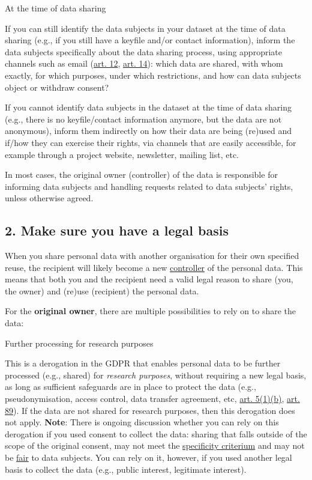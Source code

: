 \documentclass[
]{book}
\begin{document}
At the time of data sharing

If you can still identify the data subjects in your dataset at the time
of data sharing (e.g., if you still have a keyfile and/or contact information),
inform the data subjects specifically about the data sharing process, using
appropriate channels such as email
(\href{https://gdpr-info.eu/art-12-gdpr/}{art. 12},
\href{https://gdpr-info.eu/art-14-gdpr/}{art. 14}): which data are
shared, with whom exactly, for which purposes, under which restrictions, and
how can data subjects object or withdraw consent?

If you cannot identify data subjects in the dataset at the time of data sharing
(e.g., there is no keyfile/contact information anymore, but the data are not
anonymous), inform them indirectly on how their data are being (re)used and
if/how they can exercise their rights, via channels that are easily accessible,
for example through a project website, newsletter, mailing list, etc.

In most cases, the original owner (controller) of the data is responsible for
informing data subjects and handling requests related to data subjects' rights,
unless otherwise agreed.

\hypertarget{legal-basis-reuse}{%
\subsection{2. Make sure you have a legal basis}\label{legal-basis-reuse}}

When you share personal data with another organisation for their own specified
reuse, the recipient will likely become a new \protect\hyperlink{definitions}{controller} of the
personal data. This means that both you and the recipient need a valid legal
reason to share (you, the owner) and (re)use (recipient) the personal data.

For the \textbf{original owner}, there are multiple possibilities to rely on to share
the data:

Further processing for research purposes

This is a derogation in the GDPR that enables personal data to be further
processed (e.g., shared) for \emph{research purposes}, without requiring a new legal
basis, as long as sufficient safeguards are in place to protect the data
(e.g., pseudonymisation, access control, data transfer agreement, etc,
\href{https://gdpr-info.eu/art-5-gdpr/}{art. 5(1)(b)},
\href{https://gdpr-info.eu/art-89-gdpr/}{art. 89}). If the data
are not shared for research purposes, then this derogation does not apply.
\textbf{Note}: There is ongoing discussion whether you can rely on this
derogation if you used consent to collect the data: sharing that falls
outside of the scope of the original consent, may not meet the
\protect\hyperlink{consent-requirements}{specificity criterium} and may not be
\protect\hyperlink{lawful-fair-and-transparent}{fair} to data subjects. You can rely on it,
however, if you used another legal basis to collect the data (e.g., public
interest, legitimate interest).
\end{document}
